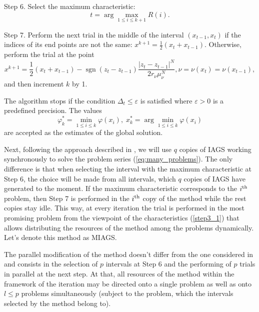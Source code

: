 \documentclass[runningheads]{llncs}
\begin{document}
Step 6. Select the maximum characteristic:
\begin{equation}
\label{step4}
t=\arg \max_{1\leqslant i \leqslant k+1}R(i).
\end{equation}

Step 7. Perform the next trial in the middle of the interval \((x_{t-1},x_{t})\) if the indices of its
end points are not the same: \(x^{k+1}={\frac {1}{2}}(x_{t}+x_{t-1})\).
Otherwise, perform the trial at the point
\begin{displaymath}
  x^{k+1}={\frac {1}{2}}(x_{t}+x_{t-1})-\operatorname {sgn}(z_{t}-z_{t-1}){\frac {|z_{t}-
z_{t-1}|^{N}}{2r_{\nu }\mu _{\nu }^{N}}},\nu =\nu (x_{t})=\nu (x_{t-1}),
\end{displaymath}
and then increment \(k\) by 1.

The algorithm stops if the condition \(\Delta_{t}\leqslant \varepsilon\) is satisfied where
\(\varepsilon>0\) is a predefined precision.
The values
\begin{equation}
\varphi_k^*=\min_{1\leqslant i \leqslant k}\varphi(x_i), \; x_k^*=\arg \min_{1\leqslant i \leqslant
k}\varphi(x_i)
\end{equation}
are accepted as the estimates of the global solution.

Next, following the approach described in \cite{BarkalovStrongin2018}, we will use \(q\) copies
of IAGS working synchronously to solve the problem series (\ref{eq:many_problems}).
The only difference is that when selecting the interval with the maximum characteristic at Step
6, the choice will be made from all intervals, which \(q\) copies of IAGS have generated to the
moment.
If the maximum characteristic corresponds to the \(i^{\rm th}\) problem, then Step 7 is
performed in the \(i^{\rm th}\) copy of the method while the rest copies stay idle.
This way, at every iteration the trial is performed in the most promising problem from the
viewpoint of the characteristics (\ref{step3_1}) that allows distributing the resources of the
method among the problems dynamically. Let's denote this method as MIAGS.

The parallel modification of the method doesn't differ from the one considered in
\cite{BarkalovStrongin2018} and consists in the selection of \(p\) intervals at Step 6 and the
performing of \(p\) trials in parallel at the next step.
At that, all resources of the method within the framework of the iteration may be directed onto
a single problem as well as onto \(l\leqslant p\) problems simultaneously (subject to the problem,
which the intervals selected by the method belong to).
\end{document}
